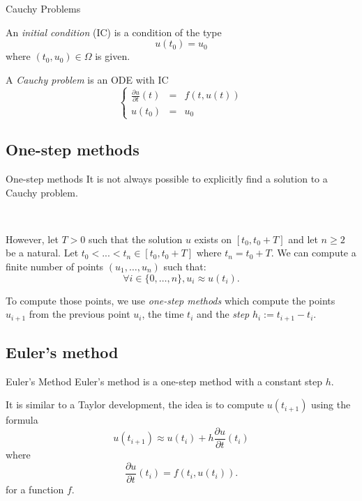 \documentclass[11pt]{beamer}
\begin{document}
\begin{frame}{Cauchy Problems}

\begin{definition}
An \textit{initial condition} (IC) is a condition of the type
$$
u(t_0) = u_0
$$
where $(t_0, u_0) \in \Omega$ is given.
\end{definition}

\begin{definition}
A \textit{Cauchy problem} is an ODE with IC
$$
\left \{
\begin{array}{rcl}
\frac{\partial u}{\partial t}(t) & = & f(t, u(t)) \\
u(t_0) & = & u_0
\end{array}
\right.
$$
\end{definition}
\end{frame}

\subsection{One-step methods}
\begin{frame}{One-step methods}
It is not always possible to explicitly find a solution to a Cauchy problem. 

~

However, let $T > 0$ such that the solution $u$ exists on $[t_0, t_0 + T]$ and let $n \geqslant 2$ be a natural. Let  $t_0 < ... < t_n \in [t_0, t_0 + T]$ where $t_n = t_0 + T$. We can compute a finite number of points $(u_1, \dots, u_n)$ such that:
$$
\forall i\in \{0,\dots, n\},  u_i \approx u(t_i).
$$

To compute those points, we use \textit{one-step methods} which compute the points $u_{i+1}$ from the previous point $u_i$, the time $t_i$ and the \textit{step} $h_i := t_{i+1} - t_i$.
\end{frame}

\subsection{Euler's method} \label{euler}
\begin{frame}{Euler's Method}
Euler's method is a one-step method with a constant step $h$. 

It is similar to a Taylor development, the idea is to compute $u(t_{i+1})$ using the formula
\begin{equation}\label{eqeuler}
u(t_{i+1}) \approx u(t_i) + h\frac{\partial u}{\partial t}(t_i)
\end{equation}
where 
$$
\frac{\partial u}{\partial t}(t_i) = f(t_i, u(t_i)).
$$
for a function $f$.
\end{frame}
\end{document}
